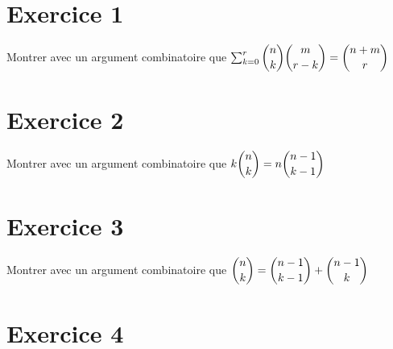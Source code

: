 \documentclass[11pt]{article}
\begin{document}
\section*{Exercice 1}

Montrer avec un argument combinatoire que $\sum_{k=0}^r \dbinom{n}{k}\dbinom{m}{r-k}=\dbinom{n+m}{r}$

\section*{Exercice 2}

Montrer avec un argument combinatoire que $k\dbinom{n}{k}=n\dbinom{n-1}{k-1}$

\section*{Exercice 3}

Montrer avec un argument combinatoire que $\dbinom{n}{k}=\dbinom{n-1}{k-1}+\dbinom{n-1}{k}$

\section*{Exercice 4}



	
\end{document}
